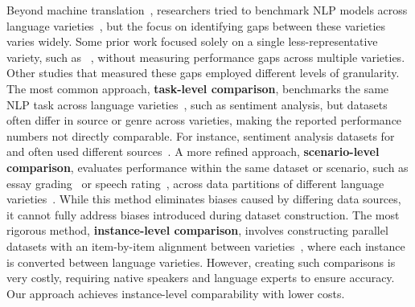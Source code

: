 
Beyond machine translation~\cite{kantharuban2023quantifying},
researchers tried to benchmark NLP models across language varieties~\cite{Zampieri_Nakov_Scherrer_2020,joshi2024natural,blodgett2020biasreview,hovy-johannsen-2016-exploring,vardial2019report}, but the focus on identifying gaps between these varieties varies widely.
Some prior work focused solely on a single less-representative variety, such as \twChinese~\cite{tamtmmlu+,chen2024measuring}, without measuring performance gaps across multiple varieties.
Other studies that measured these gaps employed different levels of granularity.
The most common approach, \textbf{task-level comparison}, benchmarks the same NLP task across language varieties~\cite{dialectbench}, such as sentiment analysis, but datasets often differ in source or genre across varieties, making the reported performance numbers not directly comparable. 
For instance, sentiment analysis datasets for \cnChinese and \twChinese often used different sources~\cite{seki2007overview}. %
A more refined approach, \textbf{scenario-level comparison}, evaluates performance within the same dataset or scenario, 
such as essay grading~\cite{liang2023gptesl} or speech rating~\cite{kwako2023bertbias},
across data partitions of different language varieties~\cite{lwowski2022measuring,AAE2017racial}. 
While this method eliminates biases caused by differing data sources, it cannot fully address biases introduced during dataset construction.
The most rigorous method, \textbf{instance-level comparison}, involves constructing parallel datasets with an item-by-item alignment between varieties~\cite{valuebench,multivaluebench,groenwold2020AAENLP,macucocorpus}, where each instance is converted between language varieties. 
However, creating such comparisons is very costly, requiring native speakers and language experts to ensure accuracy. 
Our approach achieves instance-level comparability with lower costs.








